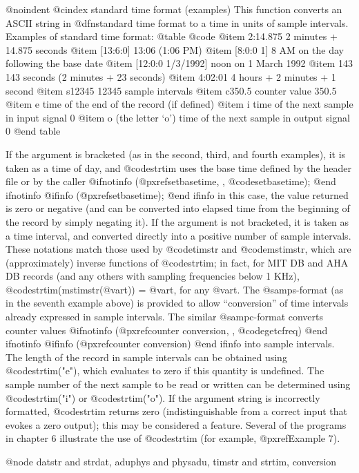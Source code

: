 {{{{{{{{@noindent
@cindex standard time format (examples)
This function converts an ASCII string in @dfn{standard time format} to a time
in units of sample intervals.  Examples of standard time format:
@table @code
@item 2:14.875
2 minutes + 14.875 seconds
@item [13:6:0]
13:06 (1:06 PM)
@item [8:0:0 1]
8 AM on the day following the base date
@item [12:0:0 1/3/1992]
noon on 1 March 1992
@item 143
143 seconds (2 minutes + 23 seconds)
@item 4:02:01
4 hours + 2 minutes + 1 second
@item s12345
12345 sample intervals
@item c350.5
counter value 350.5
@item e
time of the end of the record (if defined)
@item i
time of the next sample in input signal 0
@item o
(the letter `o') time of the next sample in output signal 0
@end table

If the argument is bracketed (as in the second, third, and fourth examples), it
is taken as a time of day, and @code{strtim} uses the base time defined
by the header file or by the caller
@ifnotinfo
(@pxref{setbasetime, , @code{setbasetime}});
@end ifnotinfo
@ifinfo
(@pxref{setbasetime});
@end ifinfo
in this case, the value returned is zero or negative (and can be
converted into elapsed time from the beginning of the record by simply
negating it).  If the argument is not bracketed, it is taken as a time
interval, and converted directly into a positive number of sample
intervals.  These notations match those used by @code{timstr} and
@code{mstimstr}, which are (approximately) inverse functions of
@code{strtim}; in fact, for MIT DB and AHA DB records (and any others
with sampling frequencies below 1 KHz), @code{strtim(mstimstr(@var{t}))}
= @var{t}, for any @var{t}.  The @samp{s}-format (as in the seventh
example above) is provided to allow ``conversion'' of time intervals
already expressed in sample intervals.  The similar @samp{c}-format
converts counter values
@ifnotinfo
(@pxref{counter conversion, , @code{getcfreq}})
@end ifnotinfo
@ifinfo
(@pxref{counter conversion})
@end ifinfo
into sample intervals.  The length of the record in
sample intervals can be obtained using @code{strtim("e")}, which
evaluates to zero if this quantity is undefined.  The sample number of
the next sample to be read or written can be determined using
@code{strtim("i")} or @code{strtim("o")}.  If the argument string is
incorrectly formatted, @code{strtim} returns zero (indistinguishable
from a correct input that evokes a zero output); this may be considered
a feature.  Several of the programs in chapter 6 illustrate the use of
@code{strtim} (for example, @pxref{Example 7}).

@node datstr and strdat, aduphys and physadu, timstr and strtim, conversion

}}}}}}}}
